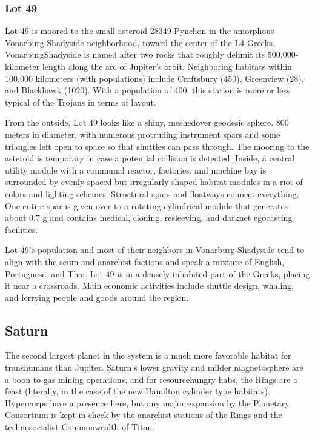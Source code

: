 \subsubsection{Lot 49} \label{sec:lot-49} 

Lot 49 is moored to the small asteroid 28349 Pynchon in the amorphous Vonarburg-Shadyside neighborhood, toward the center of the L4 Greeks. VonarburgShadyside is named after two rocks that roughly delimit its 500,000-kilometer length along the arc of Jupiter's orbit. Neighboring habitats within 100,000 kilometers (with populations) include Craftsbury (450), Greenview (28), and Blackhawk (1020). With a population of 400, this station is more or less typical of the Trojans in terms of layout. 

From the outside, Lot 49 looks like a shiny, meshedover geodesic sphere, 800 meters in diameter, with numerous protruding instrument spars and some triangles left open to space so that shuttles can pass through. The mooring to the asteroid is temporary in case a potential collision is detected. Inside, a central utility module with a communal reactor, factories, and machine bay is surrounded by evenly spaced but irregularly shaped habitat modules in a riot of colors and lighting schemes. Structural spars and floatways connect everything. One entire spar is given over to a rotating cylindrical module that generates about 0.7 g and contains medical, cloning, resleeving, and darknet egocasting facilities. 

Lot 49's population and most of their neighbors in Vonarburg-Shadyside tend to align with the scum and anarchist factions and speak a mixture of English, Portuguese, and Thai. Lot 49 is in a densely inhabited part of the Greeks, placing it near a crossroads. Main economic activities include shuttle design, whaling, and ferrying people and goods around the region. 

\subsection{Saturn} \label{sec:saturn} 

The second largest planet in the system is a much more favorable habitat for transhumans than Jupiter. Saturn's lower gravity and milder magnetosphere are a boon to gas mining operations, and for resourcehungry habs, the Rings are a feast (literally, in the case of the new Hamilton cylinder type habitats). Hypercorps have a presence here, but any major expansion by the Planetary Consortium is kept in check by the anarchist stations of the Rings and the technosocialist Commonwealth of Titan. 

